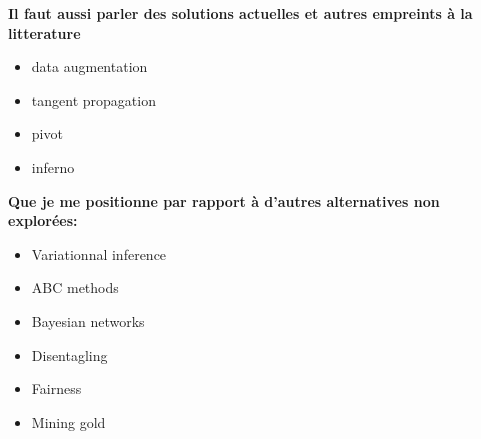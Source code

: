 \textbf{Il faut aussi parler des solutions actuelles et autres empreints à la litterature}
\begin{itemize}
    \item data augmentation
    \item tangent propagation
    \item pivot
    \item inferno
\end{itemize}

\textbf{Que je me positionne par rapport à d'autres alternatives non explorées:}
\begin{itemize}
    \item Variationnal inference
    \item ABC methods
    \item Bayesian networks
    \item Disentagling
    \item Fairness
    \item Mining gold
\end{itemize}


